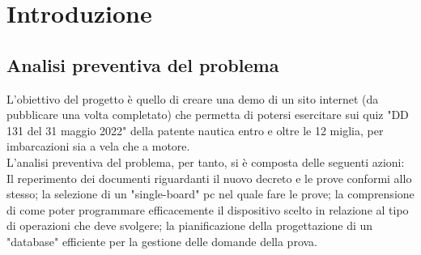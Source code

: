 \chapter{Introduzione}\label{cap:Introduzione}

\section{Analisi preventiva del problema}\label{sez:Analisi preventiva}

L'obiettivo del progetto è quello di creare una demo di un sito internet (da pubblicare una volta completato) che permetta di potersi esercitare sui quiz "DD 131 del 31 maggio 2022" della patente nautica entro e oltre le 12 miglia, per imbarcazioni sia a vela che a motore.\\
L'analisi preventiva del problema, per tanto, si è composta delle seguenti azioni: Il reperimento dei documenti riguardanti il nuovo decreto e le prove conformi allo stesso; la selezione di un "single-board" pc nel quale fare le prove; la comprensione di come poter programmare efficacemente il dispositivo scelto in relazione al tipo di operazioni che deve svolgere; la pianificazione della progettazione di un "database" efficiente per la gestione delle domande della prova.\\

